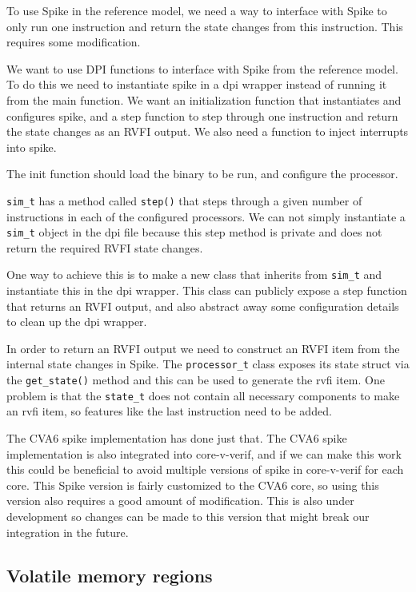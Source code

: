 To use Spike in the reference model, we need a way to interface with Spike to only run one instruction and return the state changes from this instruction. This requires some modification. 

We want to use DPI functions to interface with Spike from the reference model. To do this we need to instantiate spike in a dpi wrapper instead of running it from the main function. We want an initialization function that instantiates and configures spike, and a step function to step through one instruction and return the state changes as an RVFI output. We also need a function to inject interrupts into spike.

The init function should load the binary to be run, and configure the processor.

\lstinline{sim_t} has a method called \lstinline{step()} that steps through a given number of instructions in each of the configured processors. 
We can not simply instantiate a \lstinline{sim_t} object in the dpi file because this step method is private and does not return the required RVFI state changes.

One way to achieve this is to make a new class that inherits from \lstinline{sim_t} and instantiate this in the dpi wrapper. This class can publicly expose a step function that returns an RVFI output, and also abstract away some configuration details to clean up the dpi wrapper. 

In order to return an RVFI output we need to construct an RVFI item from the internal state changes in Spike. The \lstinline{processor_t} class exposes its state struct via the \lstinline{get_state()} method and this can be used to generate the rvfi item.
One problem is that the \lstinline{state_t} does not contain all necessary components to make an rvfi item, so features like the last instruction need to be added.


The CVA6 spike implementation has done just that. The CVA6 spike implementation is also integrated into core-v-verif, and if we can make this work this could be beneficial to avoid multiple versions of spike in core-v-verif for each core. This Spike version is fairly customized to the CVA6 core, so using this version also requires a good amount of modification.
This is also under development so changes can be made to this version that might break our integration in the future.

\subsection{Volatile memory regions}

